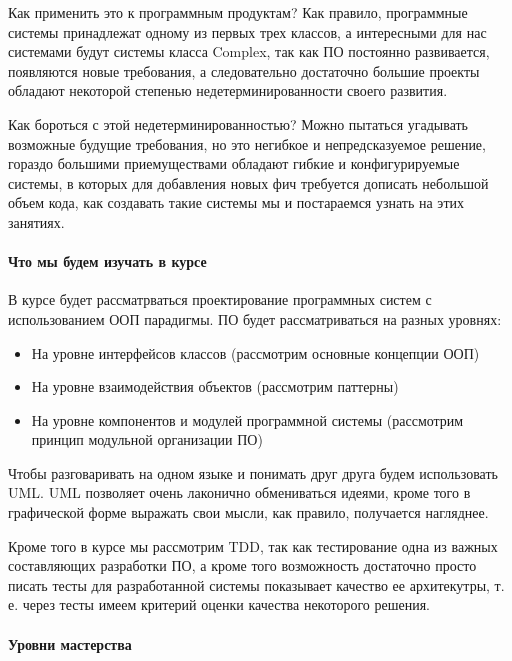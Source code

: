Как применить это к программным продуктам? Как правило, программные системы принадлежат одному из первых трех классов, а интересными для нас системами будут
системы класса Complex, так как ПО постоянно развивается, появляются новые требования, а следовательно достаточно большие проекты обладают некоторой степенью
недетерминированности своего развития.

Как бороться с этой недетерминированностью? Можно пытаться угадывать возможные будущие требования, но это негибкое и непредсказуемое решение, гораздо большими
приемуществами обладают гибкие и конфигурируемые системы, в которых для добавления новых фич требуется дописать небольшой объем кода, как создавать такие
системы мы и постараемся узнать на этих занятиях.

\paragraph{Что мы будем изучать в курсе}

В курсе будет рассматрваться проектирование программных систем с использованием ООП парадигмы. ПО будет рассматриваться на разных уровнях:

\begin{itemize}
\item На уровне интерфейсов классов (рассмотрим основные концепции ООП)

\item На уровне взаимодействия объектов (рассмотрим паттерны)

\item На уровне компонентов и модулей программной системы (рассмотрим принцип модульной организации ПО)
\end{itemize}

Чтобы разговаривать на одном языке и понимать друг друга будем использовать UML. UML позволяет очень лаконично обмениваться идеями, кроме того в графической
форме выражать свои мысли, как правило, получается нагляднее.

Кроме того в курсе мы рассмотрим TDD, так как тестирование одна из важных составляющих разработки ПО, а кроме того возможность достаточно просто писать тесты для
разработанной системы показывает качество ее архитекутры, т. е. через тесты имеем критерий оценки качества некоторого решения.

\paragraph{Уровни мастерства}

